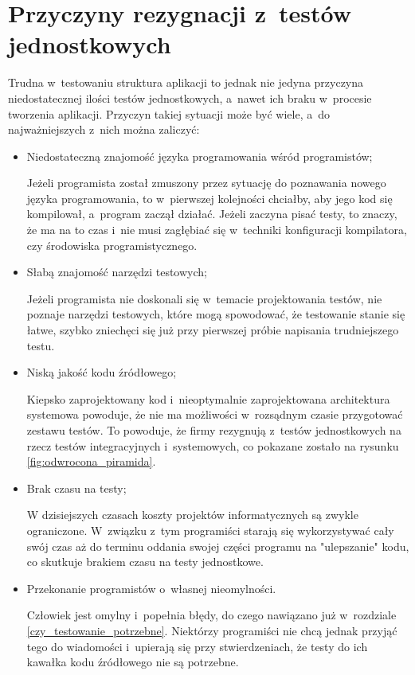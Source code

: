 \section{Przyczyny rezygnacji z~testów jednostkowych}
\label{testy_jednostkowe_brak}
Trudna w~testowaniu struktura aplikacji to jednak nie jedyna przyczyna niedostatecznej ilości testów jednostkowych, a~nawet ich braku w~procesie tworzenia aplikacji. Przyczyn takiej sytuacji może być wiele, a~do najważniejszych z~nich można zaliczyć:
\begin{itemize}
\item
Niedostateczną znajomość języka programowania wśród programistów;

Jeżeli programista został zmuszony przez sytuację do poznawania nowego języka programowania, to w~pierwszej kolejności chciałby, aby jego kod się kompilował, a~program zaczął działać. Jeżeli zaczyna pisać testy, to znaczy, że ma na to czas i~nie musi zagłębiać się w~techniki konfiguracji kompilatora, czy środowiska programistycznego. 

\item
Słabą znajomość narzędzi testowych;

Jeżeli programista nie doskonali się w~temacie projektowania testów, nie poznaje narzędzi testowych, które mogą spowodować, że testowanie stanie się łatwe, szybko zniechęci się już przy pierwszej próbie napisania trudniejszego testu.

\item
Niską jakość kodu źródłowego;

Kiepsko zaprojektowany kod i~nieoptymalnie zaprojektowana architektura systemowa powoduje, że nie ma możliwości w~rozsądnym czasie przygotować zestawu testów. To powoduje, że firmy rezygnują z~testów jednostkowych na rzecz testów integracyjnych i~systemowych, co pokazane zostało na rysunku \ref{fig:odwrocona_piramida}.

\item
Brak czasu na testy;

W dzisiejszych czasach koszty projektów informatycznych są zwykle ograniczone. W~związku z~tym programiści starają się wykorzystywać cały swój czas aż do terminu oddania swojej części programu na "ulepszanie" kodu, co skutkuje brakiem czasu na testy jednostkowe.

\item
Przekonanie programistów o~własnej nieomylności.

Człowiek jest omylny i~popełnia błędy, do czego nawiązano już w~rozdziale \ref{czy_testowanie_potrzebne}. Niektórzy programiści nie chcą jednak przyjąć tego do wiadomości i~upierają się przy stwierdzeniach, że testy do ich kawałka kodu źródłowego nie są potrzebne.
\end{itemize}

